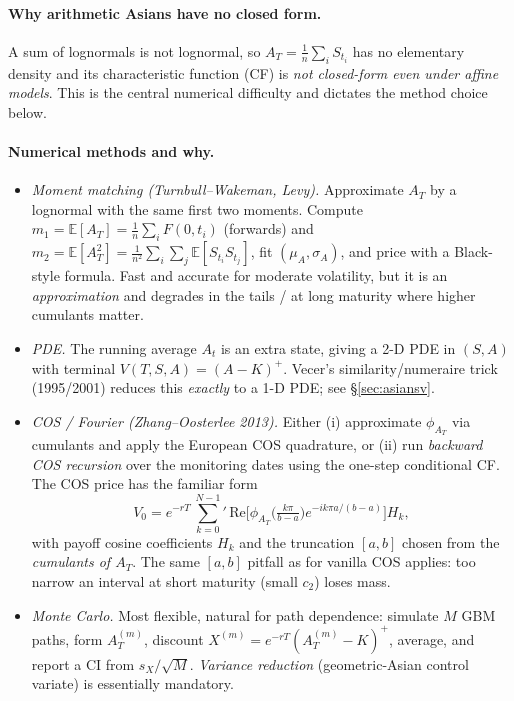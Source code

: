 \documentclass[11pt]{article}
\newcommand{\E}{\mathbb{E}}
\begin{document}
\paragraph{Why arithmetic Asians have no closed form.} A sum of lognormals is not lognormal, so
$A_T=\frac1n\sum_i S_{t_i}$ has no elementary density and its characteristic function (CF) is
\emph{not closed-form even under affine models}. This is the central numerical difficulty and dictates
the method choice below.

\paragraph{Numerical methods and why.}
\begin{itemize}[leftmargin=2em]
\item \emph{Moment matching (Turnbull--Wakeman, Levy).} Approximate $A_T$ by a lognormal with the same
first two moments. Compute $m_1=\E[A_T]=\frac1n\sum_i F(0,t_i)$ (forwards) and
$m_2=\E[A_T^2]=\frac1{n^2}\sum_i\sum_j\E[S_{t_i}S_{t_j}]$, fit $(\mu_A,\sigma_A)$, and price with a
Black-style formula. Fast and accurate for moderate volatility, but it is an \emph{approximation} and
degrades in the tails / at long maturity where higher cumulants matter.
\item \emph{PDE.} The running average $A_t$ is an extra state, giving a 2-D PDE in $(S,A)$ with
terminal $V(T,S,A)=(A-K)^+$. Vecer's similarity/numeraire trick (1995/2001) reduces this
\emph{exactly} to a 1-D PDE; see \S\ref{sec:asiansv}.
\item \emph{COS / Fourier (Zhang--Oosterlee 2013).} Either (i) approximate $\phi_{A_T}$ via cumulants
and apply the European COS quadrature, or (ii) run \emph{backward COS recursion} over the monitoring
dates using the one-step conditional CF. The COS price has the familiar form
\[
V_0=e^{-rT}\,{\sum_{k=0}^{N-1}}'\,
\mathrm{Re}\!\Big[\phi_{A_T}\!\Big(\tfrac{k\pi}{b-a}\Big)e^{-ik\pi a/(b-a)}\Big]H_k,
\]
with payoff cosine coefficients $H_k$ and the truncation $[a,b]$ chosen from the \emph{cumulants of
$A_T$}. The same $[a,b]$ pitfall as for vanilla COS applies: too narrow an interval at short
maturity (small $c_2$) loses mass.
\item \emph{Monte Carlo.} Most flexible, natural for path dependence: simulate $M$ GBM paths, form
$A_T^{(m)}$, discount $X^{(m)}=e^{-rT}(A_T^{(m)}-K)^+$, average, and report a CI from
$s_X/\sqrt M$. \emph{Variance reduction} (geometric-Asian control variate) is essentially mandatory.
\end{itemize}
\end{document}
